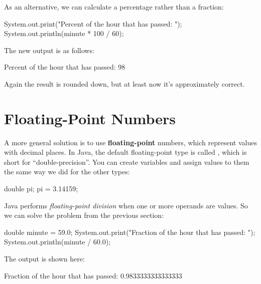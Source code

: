 As an alternative, we can calculate a percentage rather than a fraction:

\begin{code}
System.out.print("Percent of the hour that has passed: ");
System.out.println(minute * 100 / 60);
\end{code}

The new output is as follows:

\begin{stdout}
Percent of the hour that has passed: 98
\end{stdout}

Again the result is rounded down, but at least now it's approximately correct.


\section{Floating-Point Numbers}


A more general solution is to use {\bf floating-point} numbers, which represent values with decimal places.
In Java, the default floating-point type is called , which is short for ``double-precision''.
You can create  variables and assign values to them the same way we did for the other types:

\begin{code}
double pi;
pi = 3.14159;
\end{code}


Java performs {\em floating-point division} when one or more operands are  values.
So we can solve the problem from the previous section:

\begin{code}
double minute = 59.0;
System.out.print("Fraction of the hour that has passed: ");
System.out.println(minute / 60.0);
\end{code}

The output is shown here:

\begin{stdout}
Fraction of the hour that has passed: 0.9833333333333333
\end{stdout}

